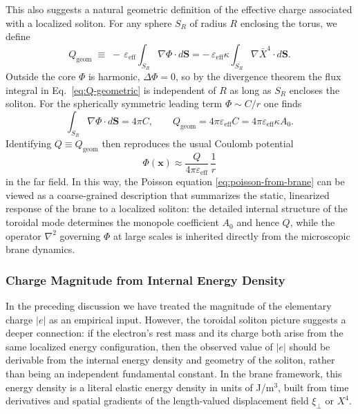 This also suggests a natural geometric definition of the effective
charge associated with a localized soliton. For any sphere $S_R$ of
radius $R$ enclosing the torus, we define
\begin{equation}
  Q_{\mathrm{geom}}
  \;\equiv\;
  -\,\varepsilon_{\mathrm{eff}}
  \int_{S_R} \nabla\Phi\cdot d\mathbf S
  =
  -\,\varepsilon_{\mathrm{eff}}\kappa
  \int_{S_R} \nabla\bar X^4\cdot d\mathbf S.
  \label{eq:Q-geometric}
\end{equation}
Outside the core $\Phi$ is harmonic, $\Delta\Phi = 0$, so by the
divergence theorem the flux integral in Eq.~\eqref{eq:Q-geometric} is
independent of $R$ as long as $S_R$ encloses the soliton. For the
spherically symmetric leading term $\Phi \sim C/r$ one finds
\begin{equation}
  \int_{S_R} \nabla\Phi\cdot d\mathbf S
  = 4\pi C,
  \qquad
  Q_{\mathrm{geom}} = 4\pi\varepsilon_{\mathrm{eff}} C
  = 4\pi\varepsilon_{\mathrm{eff}}\kappa A_0.
  \label{eq:Q-from-monopole}
\end{equation}
Identifying $Q \equiv Q_{\mathrm{geom}}$ then reproduces the usual
Coulomb potential
\begin{equation}
  \Phi(\mathbf x)
  \approx
  \frac{Q}{4\pi\varepsilon_{\mathrm{eff}}}\,\frac{1}{r}
\end{equation}
in the far field. In this way, the Poisson equation
\eqref{eq:poisson-from-brane} can be viewed as a coarse-grained
description that summarizes the static, linearized response of the brane
to a localized soliton: the detailed internal structure of the toroidal
mode determines the monopole coefficient $A_0$ and hence $Q$, while the
operator $\nabla^2$ governing $\Phi$ at large scales is inherited
directly from the microscopic brane dynamics.

\subsubsection{Charge Magnitude from Internal Energy Density}
\label{sec:charge-magnitude}

In the preceding discussion we have treated the magnitude of the elementary
charge $|e|$ as an empirical input. However, the toroidal soliton picture
suggests a deeper connection: if the electron's rest mass and its charge
both arise from the same localized energy configuration, then the observed
value of $|e|$ should be derivable from the internal energy density and
geometry of the soliton, rather than being an independent fundamental
constant. In the brane framework, this energy density is a literal elastic energy density in units of J/m$^3$, built from time derivatives and spatial gradients of the length-valued displacement field $\xi_\perp$ or $X^4$.

